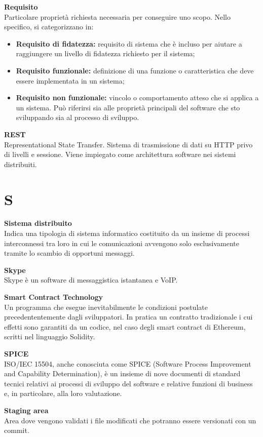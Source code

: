 \documentclass[a4paper, oneside, openany, dvipsnames, table, 12pt]{article}
\begin{document}
\textbf{Requisito}\\	Particolare proprietà richiesta necessaria per conseguire uno scopo. Nello specifico, si categorizzano in:
\begin{itemize}
	\item \textbf{Requisito di fidatezza:} requisito di sistema che è incluso per aiutare a raggiungere un livello di fidatezza richiesto per il sistema;
	\item \textbf{Requisito funzionale:} definizione di una funzione o caratteristica che deve essere implementata in un sistema;
	\item \textbf{Requisito non funzionale:} vincolo o comportamento atteso che si applica a un sistema. Può riferirsi sia alle proprietà principali del software che sto sviluppando sia al processo di sviluppo.
\end{itemize}

\textbf{REST} \\
Representational State Transfer. Sistema di trasmissione di dati su HTTP privo di livelli e sessione. Viene impiegato come architettura software nei sistemi distribuiti.

\newpage
\section{S}
\textbf{Sistema distribuito} \\
Indica una tipologia di sistema informatico costituito da un insieme di processi interconnessi tra loro in cui le comunicazioni avvengono solo esclusivamente tramite lo scambio di opportuni messaggi.

\textbf{Skype} \\
Skype è un software di messaggistica istantanea e VoIP\glo.

\textbf{Smart Contract Technology} \\
Un programma che esegue inevitabilmente le condizioni postulate precedententemente dagli sviluppatori. In pratica un contratto tradizionale i cui effetti sono garantiti da un codice, nel caso degli smart contract di Ethereum, scritti nel linguaggio Solidity.

\textbf{SPICE} \\
ISO/IEC 15504, anche conosciuta come SPICE (Software Process Improvement and Capability Determination), è un insieme di nove documenti di standard tecnici relativi ai processi di sviluppo del software e relative funzioni di business e, in particolare, alla loro valutazione.

\textbf{Staging area} \\
Area dove vengono validati i file modificati che potranno essere versionati con un commit\glo.
\end{document}

